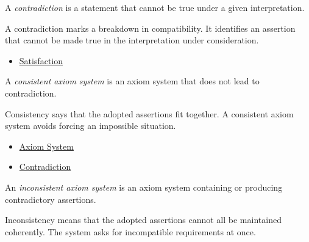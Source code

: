 \begin{definition}[Contradiction]
\label{def:axiom-systems-contradiction}
A \emph{contradiction} is a statement that cannot be true under a given
interpretation.
\end{definition}

\begin{remark*}[Interpretation]
A contradiction marks a breakdown in compatibility. It identifies an assertion
that cannot be made true in the interpretation under consideration.
\end{remark*}

\begin{dependencies}
\begin{itemize}
  \item \hyperref[def:axiom-systems-satisfaction]{Satisfaction}
\end{itemize}
\end{dependencies}

\begin{definition}
\label{def:axiom-systems-consistent-axiom-system}
A \emph{consistent axiom system} is an axiom system that does not lead to
contradiction.
\end{definition}

\begin{remark*}[Interpretation]
Consistency says that the adopted assertions fit together. A consistent axiom
system avoids forcing an impossible situation.
\end{remark*}

\begin{dependencies}
\begin{itemize}
  \item \hyperref[def:axiom-system]{Axiom System}
  \item \hyperref[def:axiom-systems-contradiction]{Contradiction}
\end{itemize}
\end{dependencies}

\begin{definition}
\label{def:axiom-systems-inconsistent-axiom-system}
An \emph{inconsistent axiom system} is an axiom system containing or producing
contradictory assertions.
\end{definition}

\begin{remark*}[Interpretation]
Inconsistency means that the adopted assertions cannot all be maintained
coherently. The system asks for incompatible requirements at once.
\end{remark*}

